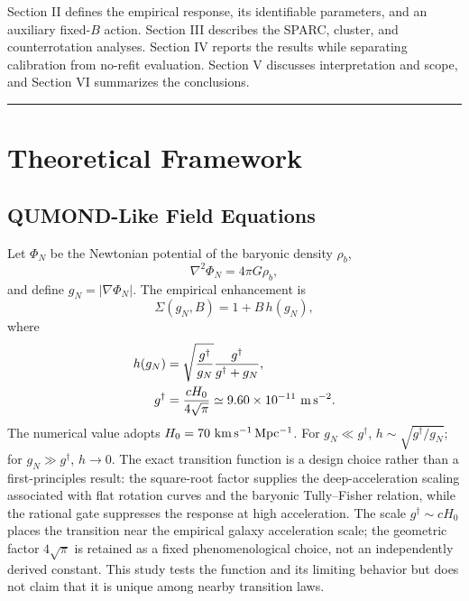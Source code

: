 \documentclass[aps,prd,reprint,superscriptaddress,showpacs,floatfix,longbibliography]{revtex4-2}
\begin{document}
Section II defines the empirical response, its identifiable parameters, and an auxiliary fixed-$B$ action. Section III describes the SPARC, cluster, and counterrotation analyses. Section IV reports the results while separating calibration from no-refit evaluation. Section V discusses interpretation and scope, and Section VI summarizes the conclusions.

\medskip\hrule\medskip

\section{Theoretical Framework}

\subsection{QUMOND-Like Field Equations}

Let $\Phi_N$ be the Newtonian potential of the baryonic density $\rho_b$,
\begin{equation}
\nabla^2\Phi_N=4\pi G\rho_b,
\label{eq:poissonN}
\end{equation}
and define $g_N=|\nabla\Phi_N|$. The empirical enhancement is
\begin{equation}
\Sigma(g_N,B)=1+B\,h(g_N),
\label{eq:sigma}
\end{equation}
where
\begin{equation}
\begin{aligned}
h(g_N)&=\sqrt{\frac{g^\dagger}{g_N}}
\frac{g^\dagger}{g^\dagger+g_N},\\
g^\dagger&=\frac{cH_0}{4\sqrt{\pi}}
\simeq9.60\times10^{-11}\ {\rm m\,s^{-2}} .
\end{aligned}
\label{eq:h}
\end{equation}
The numerical value adopts $H_0=70\ {\rm km\,s^{-1}\,Mpc^{-1}}$.
For $g_N\ll g^\dagger$, $h\sim\sqrt{g^\dagger/g_N}$; for $g_N\gg g^\dagger$, $h\rightarrow0$. The exact transition function is a design choice rather than a first-principles result: the square-root factor supplies the deep-acceleration scaling associated with flat rotation curves and the baryonic Tully--Fisher relation, while the rational gate suppresses the response at high acceleration. The scale $g^\dagger\sim cH_0$ places the transition near the empirical galaxy acceleration scale; the geometric factor $4\sqrt{\pi}$ is retained as a fixed phenomenological choice, not an independently derived constant. This study tests the function and its limiting behavior but does not claim that it is unique among nearby transition laws.
\end{document}
